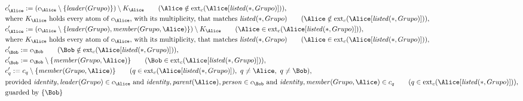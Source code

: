 \begin{align*}
&
c'_
{
\Alice
}
 := 
(c_
{
\Alice
}
 \setminus 
\{
\mathit{
leader
}
(
Grupo
)
\}
) \setminus K_
{
\Alice
}
 \qquad (
\Alice
 \notin 
\mathrm{ext}_c(
\Alice
[
\mathit{
listed
}
(
\ast
,
Grupo
)
]
)
)
,\\
&
\text{where } K_
{
\Alice
}
 \text{ holds every atom of } c_
{
\Alice
}
 \text{, with its multiplicity, that matches } 
\mathit{
listed
}
(
\ast
,
Grupo
)
 \qquad (
\Alice
 \notin 
\mathrm{ext}_c(
\Alice
[
\mathit{
listed
}
(
\ast
,
Grupo
)
]
)
)
,\\
&
c'_
{
\Alice
}
 := 
(c_
{
\Alice
}
 \setminus 
\{
\mathit{
leader
}
(
Grupo
)
,
\mathit{
member
}
(
Grupo
,
\Alice
)
\}
) \setminus K_
{
\Alice
}
 \qquad (
\Alice
 \in 
\mathrm{ext}_c(
\Alice
[
\mathit{
listed
}
(
\ast
,
Grupo
)
]
)
)
,\\
&
\text{where } K_
{
\Alice
}
 \text{ holds every atom of } c_
{
\Alice
}
 \text{, with its multiplicity, that matches } 
\mathit{
listed
}
(
\ast
,
Grupo
)
 \qquad (
\Alice
 \in 
\mathrm{ext}_c(
\Alice
[
\mathit{
listed
}
(
\ast
,
Grupo
)
]
)
)
,\\
&
c'_
{
\Bob
}
 := 
c_
{
\Bob
}
 \qquad (
\Bob
 \notin 
\mathrm{ext}_c(
\Alice
[
\mathit{
listed
}
(
\ast
,
Grupo
)
]
)
)
,\\
&
c'_
{
\Bob
}
 := 
c_
{
\Bob
}
 \setminus 
\{
\mathit{
member
}
(
Grupo
,
\Alice
)
\}
 \qquad (
\Bob
 \in 
\mathrm{ext}_c(
\Alice
[
\mathit{
listed
}
(
\ast
,
Grupo
)
]
)
)
,\\
&
c'_
q
 := 
c_
q
 \setminus 
\{
\mathit{
member
}
(
Grupo
,
\Alice
)
\}
 \qquad (
q
 \in 
\mathrm{ext}_c(
\Alice
[
\mathit{
listed
}
(
\ast
,
Grupo
)
]
)
,\ 
q \neq 
\Alice
,\ 
q \neq 
\Bob
)
,\\
&
\text{provided } 
\mathit{
identity
}
,
\mathit{
leader
}
(
Grupo
)
 \in c_
{
\Alice
}
 \text{ and } 
\mathit{
identity
}
,
\mathit{
parent
}
(
\Alice
)
,
\mathit{
person
}
 \in c_
{
\Bob
}
 \text{ and } 
\mathit{
identity
}
,
\mathit{
member
}
(
Grupo
,
\Alice
)
 \in c_
q
 \qquad (
q \in 
\mathrm{ext}_c(
\Alice
[
\mathit{
listed
}
(
\ast
,
Grupo
)
]
)
)
,\\
&
\text{guarded by } \{
\Bob
\}
\end{align*}

